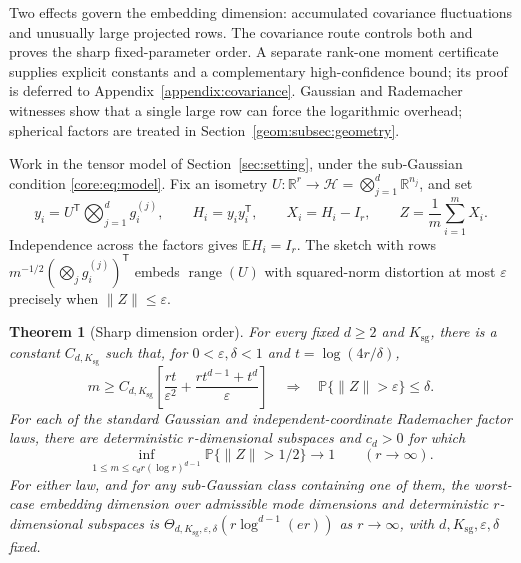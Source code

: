 \documentclass[11pt,a4paper]{article}
\newtheorem{theorem}{Theorem}[section]
\theoremstyle{definition}\newtheorem{definition}[theorem]{Definition}
\theoremstyle{remark}\newtheorem{remark}[theorem]{Remark}
\numberwithin{equation}{section}
\newcommand{\R}{\mathbb R}\newcommand{\E}{\mathbb E}\newcommand{\Pp}{\mathbb P}
\newcommand{\Ksg}{{K_{\mathrm{sg}}}}\newcommand{\Cfour}{{C_4}}
\newcommand{\norm}[1]{\lVert#1\rVert}\newcommand{\ip}[2]{\langle#1,#2\rangle}
\DeclareMathOperator{\range}{range}\DeclareMathOperator{\diag}{diag}
\begin{document}
Two effects govern the embedding dimension: accumulated covariance
fluctuations and unusually large projected rows. The covariance route
controls both and proves the sharp fixed-parameter order. A separate
rank-one moment certificate supplies explicit constants and a complementary
high-confidence bound; its proof is deferred to
Appendix~\ref{appendix:covariance}. Gaussian and Rademacher witnesses
show that a single large row can force the logarithmic overhead;
spherical factors are treated in Section~\ref{geom:subsec:geometry}.

Work in the tensor model of Section~\ref{sec:setting}, under
the sub-Gaussian condition \eqref{core:eq:model}. Fix an isometry
$U:\R^r\to\mathcal H=\bigotimes_{j=1}^d\R^{n_j}$, and set
\begin{equation}\label{core:eq:rows}
 y_i=U^{\mathsf T}\bigotimes_{j=1}^d g_i^{(j)},\qquad
 H_i=y_iy_i^{\mathsf T},\qquad X_i=H_i-I_r,\qquad
 Z=\frac1m\sum_{i=1}^mX_i.
\end{equation}
Independence across the factors gives $\E H_i=I_r$. The sketch with rows
$m^{-1/2}(\bigotimes_jg_i^{(j)})^{\mathsf T}$ embeds $\range(U)$ with
squared-norm distortion at most $\varepsilon$ precisely when
$\norm Z\le\varepsilon$.

\begin{theorem}[Sharp dimension order]\label{core:thm:ose}
For every fixed $d\ge2$ and $\Ksg$, there is a constant $C_{d,\Ksg}$ such that,
for $0<\varepsilon,\delta<1$ and $t=\log(4r/\delta)$,
\begin{equation}\label{core:eq:ose}
 m\ge C_{d,\Ksg}\left[
 \frac{rt}{\varepsilon^2}+
 \frac{rt^{d-1}+t^d}{\varepsilon}\right]
 \quad\Longrightarrow\quad
 \Pp\{\norm Z>\varepsilon\}\le\delta.
\end{equation}
For each of the standard Gaussian and independent-coordinate Rademacher
factor laws, there are deterministic
$r$-dimensional subspaces and $c_d>0$ for which
\begin{equation}\label{core:eq:lower-main}
 \inf_{1\le m\le c_dr(\log r)^{d-1}}
 \Pp\{\norm Z>1/2\}\longrightarrow1
 \qquad(r\longrightarrow\infty).
\end{equation}
For either law, and for any sub-Gaussian class containing one of them,
the worst-case embedding dimension over admissible mode dimensions
and deterministic $r$-dimensional subspaces is
$\Theta_{d,\Ksg,\varepsilon,\delta}(r\log^{d-1}(er))$ as $r\to\infty$,
with $d,\Ksg,\varepsilon,\delta$ fixed.
\end{theorem}
\end{document}
